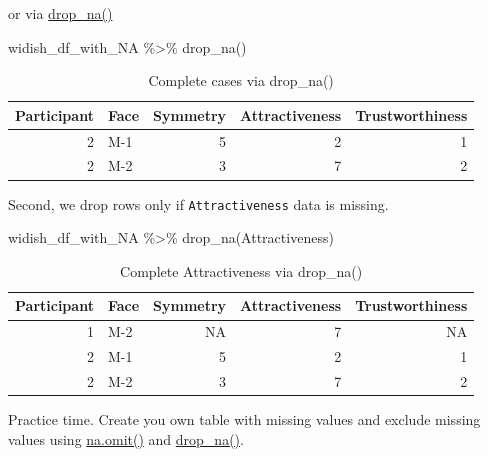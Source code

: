 \documentclass[
]{book}
\newenvironment{Shaded}{\begin{snugshade}}{\end{snugshade}}
\newcommand{\FunctionTok}[1]{\textcolor[rgb]{0.00,0.00,0.00}{#1}}
\newcommand{\NormalTok}[1]{#1}
\newcommand{\SpecialCharTok}[1]{\textcolor[rgb]{0.00,0.00,0.00}{#1}}
\begin{document}
or via \href{https://tidyr.tidyverse.org/reference/drop_na.html}{drop\_na()}

\begin{Shaded}
\begin{Highlighting}[]
\NormalTok{widish\_df\_with\_NA }\SpecialCharTok{\%\textgreater{}\%}
  \FunctionTok{drop\_na}\NormalTok{()}
\end{Highlighting}
\end{Shaded}

\begin{table}

\caption{\label{tab:unnamed-chunk-284}Complete cases via drop\_na()}
\centering
\begin{tabular}[t]{r|l|r|r|r}
\hline
Participant & Face & Symmetry & Attractiveness & Trustworthiness\\
\hline
2 & M-1 & 5 & 2 & 1\\
\hline
2 & M-2 & 3 & 7 & 2\\
\hline
\end{tabular}
\end{table}

Second, we drop rows only if \texttt{Attractiveness} data is missing.

\begin{Shaded}
\begin{Highlighting}[]
\NormalTok{widish\_df\_with\_NA }\SpecialCharTok{\%\textgreater{}\%}
  \FunctionTok{drop\_na}\NormalTok{(Attractiveness)}
\end{Highlighting}
\end{Shaded}

\begin{table}

\caption{\label{tab:unnamed-chunk-285}Complete Attractiveness via drop\_na()}
\centering
\begin{tabular}[t]{r|l|r|r|r}
\hline
Participant & Face & Symmetry & Attractiveness & Trustworthiness\\
\hline
1 & M-2 & NA & 7 & NA\\
\hline
2 & M-1 & 5 & 2 & 1\\
\hline
2 & M-2 & 3 & 7 & 2\\
\hline
\end{tabular}
\end{table}

Practice time. Create you own table with missing values and exclude missing values using \href{https://stat.ethz.ch/R-manual/R-devel/library/stats/html/na.fail.html}{na.omit()} and \href{https://tidyr.tidyverse.org/reference/drop_na.html}{drop\_na()}.
\end{document}
